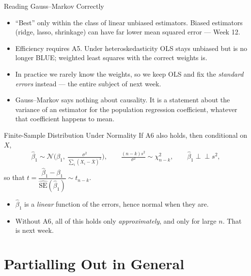 \documentclass[aspectratio=169,11pt,xcolor=dvipsnames]{beamer}
\newcommand{\indep}{\perp\!\!\!\perp}
\begin{document}
\begin{frame}{Reading Gauss--Markov Correctly}
\begin{itemize}\itemsep5pt
  \item ``Best'' only \alert{within the class of linear unbiased} estimators.
        Biased estimators (ridge, lasso, shrinkage) can have far lower mean
        squared error --- Week 12.
  \item Efficiency requires A5. Under heteroskedasticity OLS stays unbiased but is
        no longer BLUE; weighted least squares with the correct weights is.
  \item In practice we rarely know the weights, so we keep OLS and fix the
        \emph{standard errors} instead --- the entire subject of next week.
  \item Gauss--Markov says nothing about causality. It is a statement about the
        variance of an estimator for the population regression coefficient,
        whatever that coefficient happens to mean.
\end{itemize}
\end{frame}

\begin{frame}{Finite-Sample Distribution Under Normality}
If A6 also holds, then conditional on $X$,
\begin{align*}
  \hat\beta_1 \sim \mathcal{N}\Big(\beta_1,\ \tfrac{\sigma^2}{\sum_i (X_i-\bar X)^2}\Big),
  \qquad
  \frac{(n-k)s^2}{\sigma^2} \sim \chi^2_{n-k},
  \qquad
  \hat\beta_1 \indep s^2 ,
\end{align*}
so that
$t = \dfrac{\hat\beta_1 - \beta_1}{\widehat{\text{SE}}(\hat\beta_1)} \sim t_{n-k}$.
\vskip6pt
\begin{itemize}
  \item $\hat\beta_1$ is a \emph{linear} function of the errors, hence normal when
        they are.
  \item Without A6, all of this holds only \emph{approximately}, and only for
        large $n$. That is next week.
\end{itemize}
\end{frame}

\section[Partialling Out]{Partialling Out in General}
\begin{frame}\sectionpage\end{frame}
\end{document}
